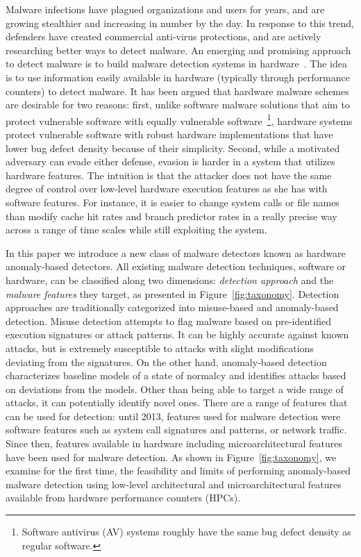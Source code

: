 \documentclass{acm_proc_article-sp}
\begin{document}
Malware infections have plagued organizations and users for years,
and are growing stealthier and increasing in number by the day.  In
response to this trend, defenders have created commercial anti-virus
protections, and are actively researching better ways to detect
malware.  An emerging and promising approach to detect malware is
to build malware detection systems in
hardware~\cite{Demme:2013:FOM:2485922.2485970}. The idea is to use
information easily available in hardware (typically through performance
counters) to detect malware. It has been argued that hardware malware
schemes are desirable for two reasons: first, unlike software malware
solutions that aim to protect vulnerable software with equally
vulnerable software~\footnote{Software antivirus (AV) systems roughly
have the same bug defect density as regular software.}, hardware
systems protect vulnerable software with robust hardware implementations
that have lower bug defect density because of their simplicity.
Second, while a motivated adversary can evade either defense, evasion
is harder in a system that utilizes hardware features. The intuition is that
the attacker does not have the same degree of control over low-level
hardware execution features as she has with software features. For
instance, it is easier to change system calls or file names than
modify cache hit rates and branch predictor rates in a really precise
way across a range of time scales while still exploiting the system.

In this paper we introduce a new class of malware detectors known
as hardware anomaly-based detectors. All existing malware detection
techniques, software or hardware, can be classified along two
dimensions: \textit{detection approach} and the \textit{malware
features} they target, as presented in Figure~\ref{fig:taxonomy}.
Detection approaches are traditionally categorized into
misuse-based and anomaly-based detection. Misuse detection attempts
to flag malware based on pre-identified execution signatures or
attack patterns.  It can be highly accurate against known attacks,
but is extremely susceptible to attacks with slight modifications
deviating from the signatures.  On the other hand, anomaly-based
detection characterizes baseline models of a state of normalcy and
identifies attacks based on deviations from the models. Other than
being able to target a wide range of attacks, it can potentially
identify novel ones. There are a range of features that can be used
for detection: until 2013, features used for malware detection were
software features such as system call signatures and patterns, or
network traffic. Since then, features available in hardware including
microarchitectural features have been used for malware detection.
As shown in Figure~\ref{fig:taxonomy}, we examine for the first
time, the feasibility and limits of performing anomaly-based malware
detection using low-level architectural and microarchitectural
features available from hardware performance counters (HPCs).
\end{document}
